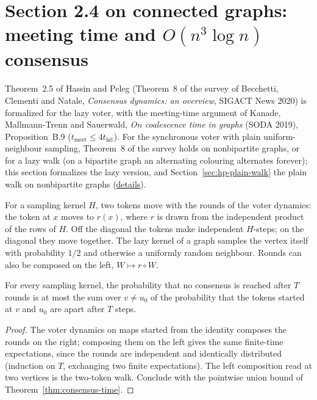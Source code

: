 \section{Section 2.4 on connected graphs: meeting time and $O(n^3\log n)$ consensus}\label{sec:kms-meeting-time}
Theorem~2.5 of Hassin and Peleg (Theorem~8 of the survey of Becchetti, Clementi and Natale,
\emph{Consensus dynamics: an overview}, SIGACT News 2020) is formalized for the lazy voter, with
the meeting-time argument of Kanade, Mallmann-Trenn and Sauerwald, \emph{On coalescence time in
graphs} (SODA 2019), Proposition~B.9 ($t_{\mathrm{meet}}\le 4t_{\mathrm{hit}}$). For the
synchronous voter with plain uniform-neighbour sampling, Theorem~8 of the survey holds on
nonbipartite graphs, or for a lazy walk (on a bipartite graph an alternating colouring alternates
forever); this section formalizes the lazy
version, and Section~\ref{sec:hp-plain-walk} the plain walk on nonbipartite graphs
(\href{https://github.com/formal-dynamics/leanamics/blob/main/voter/FORMALIZATION_DIFFERENCES.md#41-survey-theorem-8-the-lazy-walk-is-formalized}{details}).
\begin{definition}\label{def:pairwalk}
\leanok{}
For a sampling kernel $H$, two tokens move with the rounds of the voter dynamics: the
token at $x$ moves to $r(x)$, where $r$ is drawn from the independent product of the rows
of $H$. Off the diagonal the tokens make independent $H$-steps; on the diagonal they move
together. The lazy kernel of a graph samples the vertex itself with probability $1/2$ and
otherwise a uniformly random neighbour. Rounds can also be composed on the left,
$W\mapsto r\circ W$.
\end{definition}
\begin{lemma}\label{lem:duality-general}
\leanok{}
For every sampling kernel, the probability that no consensus is reached after $T$ rounds
is at most the sum over $v\neq u_0$ of the probability that the tokens started at $v$ and
$u_0$ are apart after $T$ steps.
\end{lemma}
\begin{proof}\leanok
The voter dynamics on maps started from the identity composes the rounds on the right;
composing them on the left gives the same finite-time expectations, since the rounds are
independent and identically distributed (induction on $T$, exchanging two finite
expectations). The left composition read at two vertices is the two-token walk. Conclude
with the pointwise union bound of Theorem~\ref{thm:consensus-time}.
\end{proof}
